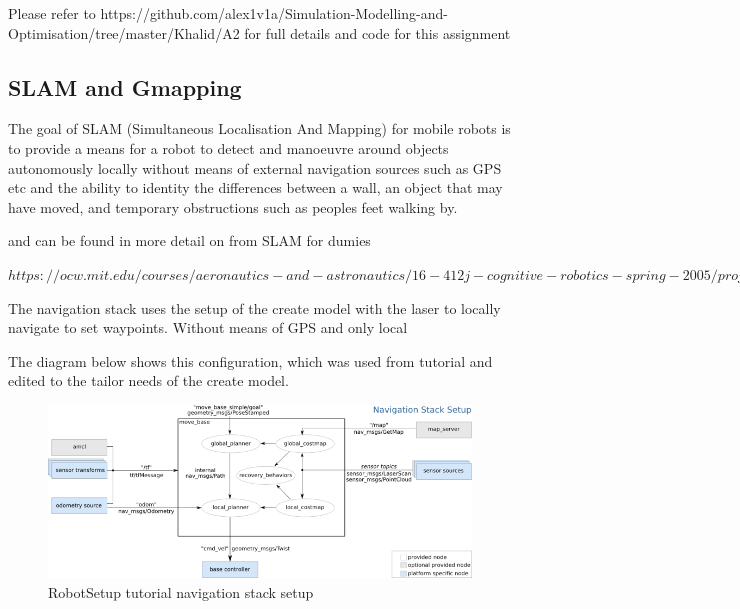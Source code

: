 \documentclass[a4paper, 10pt]{IEEEconf}
\begin{document}
Please refer to https://github.com/alex1v1a/Simulation-Modelling-and-Optimisation/tree/master/Khalid/A2 for full details and code for this assignment


\subsection{SLAM and Gmapping}


The goal of SLAM (Simultaneous Localisation And Mapping) for mobile robots is to provide a means for a robot to detect and manoeuvre around objects autonomously locally without means of external navigation sources such as GPS etc and the ability to identity the differences between a wall, an object that may have moved, and temporary obstructions such as peoples feet walking by.

and can be found in more detail on from SLAM for dumies

$https://ocw.mit.edu/courses/aeronautics-and-astronautics/16-412j-cognitive-robotics-spring-2005/projects/1aslam_blas_repo.pdf$

The navigation stack uses the setup of the create model with the laser to locally navigate to set waypoints. Without means of GPS and only local 

The diagram below shows this configuration, which was used from tutorial and edited to the tailor needs of the create model.

\begin{figure}[H]
  \includegraphics[width=\linewidth, center]{images/RobotSetup}
  \caption{RobotSetup tutorial navigation stack setup}
  \label{fig:RobotSetup tutorial navigation stack setup}
\end{figure}
\end{document}
